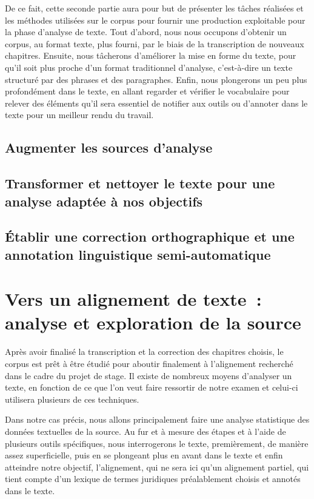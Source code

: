 \documentclass[a4paper,12pt, twoside]{book}
\begin{document}
De ce fait, cette seconde partie aura pour but de présenter les tâches réalisées et les méthodes utilisées sur le corpus pour fournir une production exploitable pour la phase d'analyse de texte. Tout d'abord, nous nous occupons d'obtenir un corpus, au format texte, plus fourni, par le biais de la transcription de nouveaux chapitres. Ensuite, nous tâcherons d'améliorer la mise en forme du texte, pour qu'il soit plus proche d'un format traditionnel d'analyse, c'est-à-dire un texte structuré par des phrases et des paragraphes. Enfin, nous plongerons un peu plus profondément dans le texte, en allant regarder et vérifier le vocabulaire pour relever des éléments qu'il sera essentiel de notifier aux outils ou d'annoter dans le texte pour un meilleur rendu du travail. 

\chapter{Augmenter les sources d'analyse}

\chapter{\label{chap_mise_en_forme}Transformer et nettoyer le texte pour une analyse adaptée à nos objectifs}

\chapter{Établir une correction orthographique et une annotation linguistique semi-automatique}


\part{Vers un alignement de texte~: analyse et exploration de la source}
Après avoir finalisé la transcription et la correction des chapitres choisis, le corpus est prêt à être étudié pour aboutir finalement à l'alignement recherché dans le cadre du projet de stage. Il existe de nombreux moyens d'analyser un texte, en fonction de ce que l'on veut faire ressortir de notre examen et celui-ci utilisera plusieurs de ces techniques.

Dans notre cas précis, nous allons principalement faire une analyse statistique des données textuelles de la source. Au fur et à mesure des étapes et à l'aide de plusieurs outils spécifiques, nous interrogerons le texte, premièrement, de manière assez superficielle, puis en se plongeant plus en avant dans le texte et enfin atteindre notre objectif, l'alignement, qui ne sera ici qu'un alignement partiel, qui tient compte d'un lexique de termes juridiques préalablement choisis et annotés dans le texte.
\end{document}
